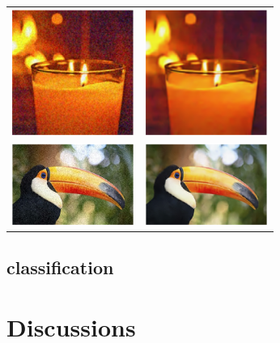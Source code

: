 \documentclass[a4paper]{article}
\begin{document}
\begin{center}
\begin{tabular}{c c}
\includegraphics[width=4cm]{./figures/candle_noise.eps} & \includegraphics[width=4cm]{./figures/candle_clean.eps}\\
\includegraphics[width=4cm]{./figures/bird_noise.eps} & \includegraphics[width=4cm]{./figures/bird_clean.eps}\\
\end{tabular}
\end{center}

\subsection{classification}












\newpage
\section{Discussions}
\end{document}
